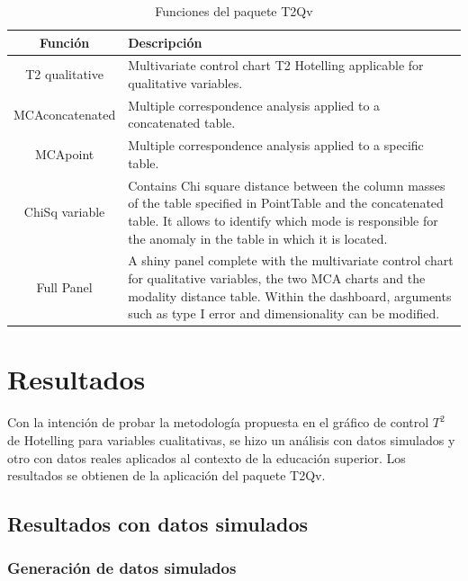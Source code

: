 \documentclass[mathematics,article,submit,moreauthors,pdftex]{mdpi}
\begin{document}
\begin{table}[h!]
\begin{center}
 \begin{tabular}{||c  m{35em}||} 
 \hline
  Función & Descripción \\ [0.5ex] 
 \hline\hline
 T2 qualitative & Multivariate control chart T2 Hotelling applicable for qualitative variables.\\
 \hline
  MCAconcatenated & Multiple correspondence analysis applied to a concatenated table.\\
\hline
  MCApoint & Multiple correspondence analysis applied to a specific table.\\
\hline
  ChiSq variable & Contains Chi square distance between the column masses of the table specified in PointTable and the concatenated table. It allows to identify which mode is responsible for the anomaly in the table in which it is located. \\ [1ex] 
  \hline
  Full Panel & A shiny panel complete with the 
  multivariate control chart for 
  qualitative variables, the two MCA 
  charts and the modality distance table. 
  Within the dashboard, arguments such as 
  type I error and dimensionality can be 
  modified. \\ [1ex] 
 \hline
\end{tabular}\caption{Funciones del paquete T2Qv}
\label{tab:functions}
\end{center}
\end{table}

\hypertarget{resultados}{%
\section{Resultados}\label{resultados}}

Con la intención de probar la metodología propuesta en el gráfico de
control \(T^2\) de Hotelling para variables cualitativas, se hizo un
análisis con datos simulados y otro con datos reales aplicados al
contexto de la educación superior. Los resultados se obtienen de la
aplicación del paquete T2Qv.

\hypertarget{resultados-con-datos-simulados}{%
\subsection{Resultados con datos
simulados}\label{resultados-con-datos-simulados}}

\hypertarget{generaciuxf3n-de-datos-simulados}{%
\subsubsection{Generación de datos
simulados}\label{generaciuxf3n-de-datos-simulados}}
\end{document}
